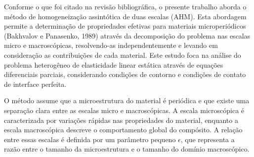 Conforme o que foi citado na revisão bibliográfica, o presente trabalho aborda o método de homogeneização assintótica de duas escalas (AHM). Esta abordagem permite a determinação de propriedades efetivas para materiais microperiódicos {(Bakhvalov e Panasenko, 1989)} através da decomposição do problema nas escalas micro e macroscópicas, resolvendo-as independentemente e levando em consideração as contribuições de cada material. Este estudo foca na análise do problema heterogêneo de elasticidade linear estática através de equações diferenciais parciais, considerando condições de contorno e condições de contato de interface perfeita.


O método assume que a microestrutura do material é periódica e que existe uma separação clara entre as escalas micro e macroscópicas. A escala microscópica é caracterizada por variações rápidas nas propriedades do material, enquanto a escala macroscópica descreve o comportamento global do compósito. A relação entre essas escalas é definida por um parâmetro pequeno $\epsilon$, que representa a razão entre o tamanho da microestrutura e o tamanho do domínio macroscópico.


